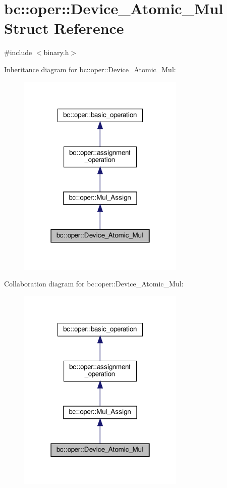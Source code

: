 \hypertarget{structbc_1_1oper_1_1Device__Atomic__Mul}{}\section{bc\+:\+:oper\+:\+:Device\+\_\+\+Atomic\+\_\+\+Mul Struct Reference}
\label{structbc_1_1oper_1_1Device__Atomic__Mul}


{\ttfamily \#include $<$binary.\+h$>$}



Inheritance diagram for bc\+:\+:oper\+:\+:Device\+\_\+\+Atomic\+\_\+\+Mul\+:\nopagebreak
\begin{figure}[H]
\begin{center}
\leavevmode
\includegraphics[width=226pt]{structbc_1_1oper_1_1Device__Atomic__Mul__inherit__graph}
\end{center}
\end{figure}


Collaboration diagram for bc\+:\+:oper\+:\+:Device\+\_\+\+Atomic\+\_\+\+Mul\+:\nopagebreak
\begin{figure}[H]
\begin{center}
\leavevmode
\includegraphics[width=226pt]{structbc_1_1oper_1_1Device__Atomic__Mul__coll__graph}
\end{center}
\end{figure}
